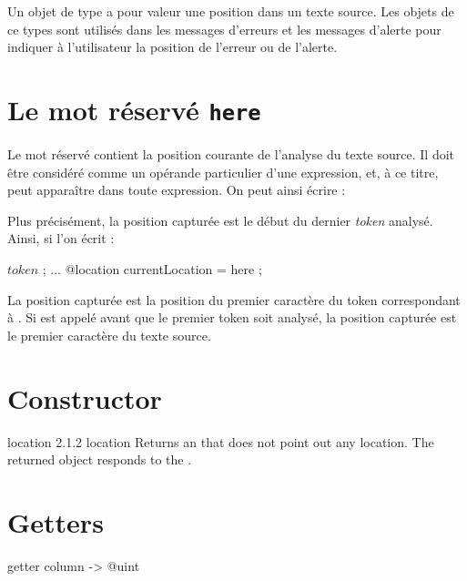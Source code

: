 

Un objet de type  a pour valeur une position dans un texte source. Les objets de ce types sont utilisés dans les messages d'erreurs et les messages d'alerte pour indiquer à l'utilisateur la position de l'erreur ou de l'alerte.





\section{Le mot réservé \texttt{here}}

Le mot réservé  contient la position courante de l'analyse du texte source. Il doit être considéré comme un opérande particulier d'une expression, et, à ce titre, peut apparaître dans toute expression. On peut ainsi écrire :


Plus précisément, la position capturée est le début du dernier \emph{token} analysé. Ainsi, si l'on écrit :

\begin{galgascode}
  $token$ ;
  ...
  @location currentLocation = here ;
\end{galgascode}

La position capturée est la position du premier caractère du token correspondant à . Si  est appelé avant que le premier token soit analysé, la position capturée est le premier caractère du texte source.

\section{Constructor}

{location}
{2.1.2}
{location}
{Returns an  that does not point out any location.}
{The returned object responds  to the .}

\section{Getters}


\begin{galgascode}
getter column -> @uint
\end{galgascode}

